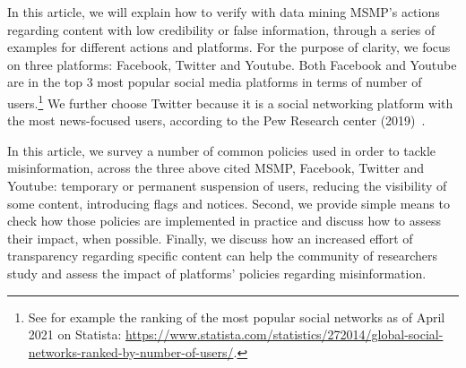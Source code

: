 \documentclass[11pt,a4paper]{article}
\begin{document}
In this article, we will explain how to verify with data mining MSMP's actions regarding content with low credibility or false information, through a series of examples for different actions and platforms. For the purpose of clarity, we focus on three platforms: Facebook, Twitter and Youtube. Both Facebook and Youtube are in the top 3 most popular social media platforms in terms of number of users.\footnote{See for example the ranking of the most popular social networks as of April 2021 on Statista: \href{https://www.statista.com/statistics/272014/global-social-networks-ranked-by-number-of-users/}{https://www.statista.com/statistics/272014/global-social-networks-ranked-by-number-of-users/}.} We further choose Twitter because it is a social networking platform with the most news-focused users, according to the Pew Research center (2019)~\cite{pew1}. 

In this article, we survey a number of common policies used in order to tackle misinformation, across the three above cited MSMP, Facebook, Twitter and Youtube: temporary or permanent suspension of users, reducing the visibility of some content, introducing flags and notices. Second, we provide simple means to check how those policies are implemented in practice and discuss how to assess their impact, when possible. Finally, we discuss how an increased effort of transparency regarding specific content can help the community of researchers study and assess the impact of platforms' policies regarding misinformation.  %
\bigskip


\end{document}
